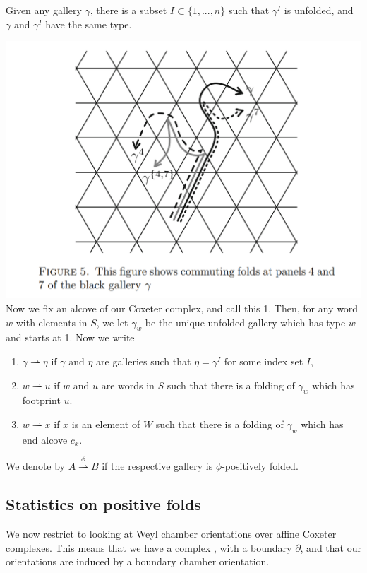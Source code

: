 \documentclass[11pt]{article}
\begin{document}
\begin{corollary}
    Given any gallery $\gamma$, there is a subset $I\subset \{1,...,n\}$ such that $\gamma^I$ is unfolded, and $\gamma$ and $\gamma^I$ have the same type.
\end{corollary}


\includegraphics[scale=0.6]{Screenshot 2023-02-03 153412.png}\\


Now we fix an alcove of our Coxeter complex, and call this 1. Then, for any word $w$ with elements in $S$, we let $\gamma_w$ be the unique unfolded gallery which has type $w$ and starts at 1. Now we write
\begin{enumerate}
    \item $\gamma \rightharpoonup \eta$ if $\gamma$ and $\eta$ are galleries such that $\eta = \gamma^I$ for some index set $I$,
    \item $w\rightharpoonup u$ if $w$ and $u$ are words in $S$ such that there is a folding of $\gamma_w$ which has footprint $u$.
    \item $w\rightharpoonup x$ if $x$ is an element of $W$ such that there is a folding of $\gamma_w$ which has end alcove $c_x$. 
\end{enumerate}
We denote by $A\stackrel{\phi}{\rightharpoonup} B$ if the respective gallery is $\phi$-positively folded.

\subsection{Statistics on positive folds}

We now restrict to looking at Weyl chamber orientations over affine Coxeter complexes. This means that we have a complex \sg, with a boundary $\partial$\sg, and that our orientations are induced by a boundary chamber orientation. 
\end{document}
